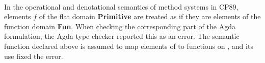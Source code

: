 \begin{AgdaAlign}
\begin{code}
\AgdaSpace{}%
\AgdaSymbol{:}\AgdaSpace{}%
\AgdaSymbol{;}\AgdaSpace{}%
\AgdaSpace{}%
\AgdaSymbol{:}\AgdaSpace{}%
\AgdaSymbol{;}\AgdaSpace{}%
\AgdaSpace{}%
\AgdaSymbol{:}\AgdaSpace{}%
\<%
\\
\>[0]\AgdaSpace{}%
\AgdaSpace{}%
\AgdaSymbol{:}\AgdaSpace{}%
\AgdaSpace{}%
\AgdaSpace{}%
\AgdaSymbol{;}\AgdaSpace{}%
\AgdaSpace{}%
\AgdaSymbol{:}\AgdaSpace{}%
\AgdaSpace{}%
\AgdaSpace{}%
\AgdaSymbol{;}\AgdaSpace{}%
\AgdaSpace{}%
\AgdaSpace{}%
\AgdaSymbol{:}\AgdaSpace{}%
\AgdaSpace{}%
\AgdaSpace{}%
\AgdaSymbol{;}\AgdaSpace{}%
\AgdaSpace{}%
\AgdaSymbol{:}\AgdaSpace{}%
\AgdaSpace{}%
\AgdaSpace{}%
\<%
\end{code}
%
In the operational and denotational semantics of method systems in CP89,
elements $f$ of the flat domain \textbf{Primitive} are treated
as if they are elements of the function domain \textbf{Fun}.
When checking the corresponding part of the Agda formulation,
the Agda type checker reported this as an error.
The semantic function  declared above is assumed to map
elements of  to functions on ,
and its use fixed the error.


\end{AgdaAlign}
